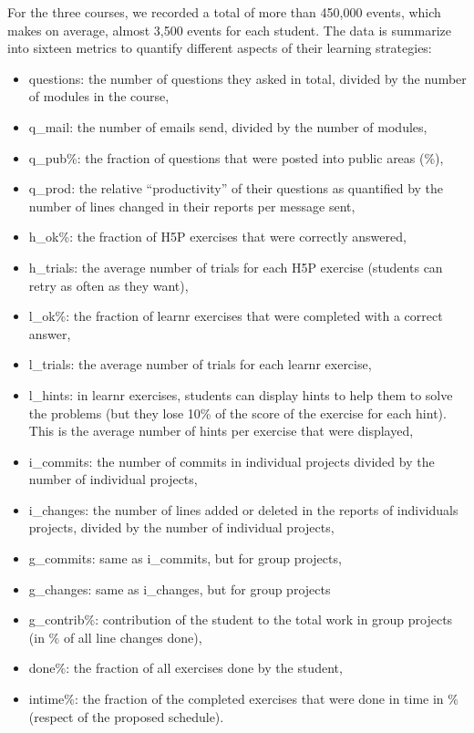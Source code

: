 \documentclass[
]{article}
\providecommand{\tightlist}{%
  \setlength{\itemsep}{0pt}\setlength{\parskip}{0pt}}
\begin{document}
For the three courses, we recorded a total of more than 450,000 events,
which makes on average, almost 3,500 events for each student. The data
is summarize into sixteen metrics to quantify different aspects of their
learning strategies:

\begin{itemize}
\tightlist
\item
  questions: the number of questions they asked in total, divided by the
  number of modules in the course,
\item
  q\_mail: the number of emails send, divided by the number of modules,
\item
  q\_pub\%: the fraction of questions that were posted into public areas
  (\%),
\item
  q\_prod: the relative ``productivity'' of their questions as
  quantified by the number of lines changed in their reports per message
  sent,
\item
  h\_ok\%: the fraction of H5P exercises that were correctly answered,
\item
  h\_trials: the average number of trials for each H5P exercise
  (students can retry as often as they want),
\item
  l\_ok\%: the fraction of learnr exercises that were completed with a
  correct answer,
\item
  l\_trials: the average number of trials for each learnr exercise,
\item
  l\_hints: in learnr exercises, students can display hints to help them
  to solve the problems (but they lose 10\% of the score of the exercise
  for each hint). This is the average number of hints per exercise that
  were displayed,
\item
  i\_commits: the number of commits in individual projects divided by
  the number of individual projects,
\item
  i\_changes: the number of lines added or deleted in the reports of
  individuals projects, divided by the number of individual projects,
\item
  g\_commits: same as i\_commits, but for group projects,
\item
  g\_changes: same as i\_changes, but for group projects
\item
  g\_contrib\%: contribution of the student to the total work in group
  projects (in \% of all line changes done),
\item
  done\%: the fraction of all exercises done by the student,
\item
  intime\%: the fraction of the completed exercises that were done in
  time in \% (respect of the proposed schedule).
\end{itemize}
\end{document}
